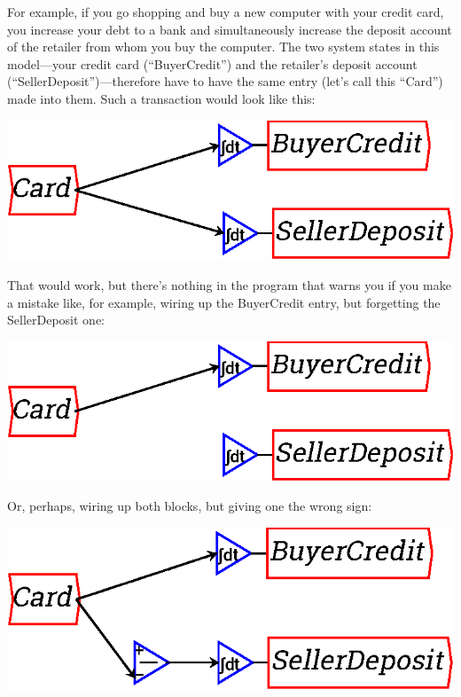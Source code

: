 For example, if you go shopping and buy a new computer with your
credit card, you increase your debt to a bank and simultaneously
increase the deposit account of the retailer from whom you buy the
computer. The two system states in this model---your credit card
(``BuyerCredit'') and the retailer's deposit account
(``SellerDeposit'')---therefore have to have the same entry (let's call
this ``Card'') made into them. Such a transaction would look
like this:


\begin{center}
\includegraphics{images/NewItem11.eps}
\end{center}

That would work, but there's nothing in the program that warns you if
you make a mistake like, for example, wiring up the BuyerCredit entry,
but forgetting the SellerDeposit one:

\begin{center}
\includegraphics{images/NewItem12.eps}
\end{center}

Or, perhaps, wiring up both blocks, but giving one the wrong sign:

\begin{center}
\includegraphics{images/NewItem51.eps}
\end{center}

